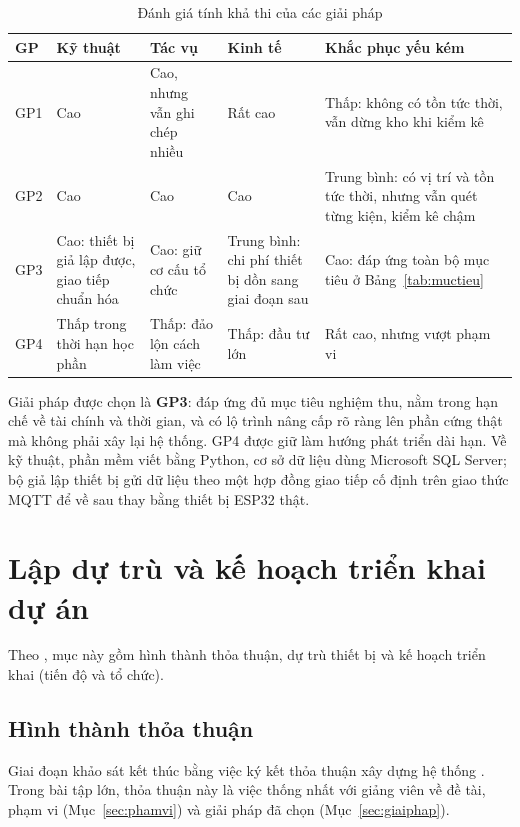 \begin{table}[H]
\centering
\caption{Đánh giá tính khả thi của các giải pháp}
\label{tab:khathi}
\small
\begin{tabularx}{\textwidth}{l L{3cm} L{3cm} L{2.6cm} Y}
\toprule
\textbf{GP} & \textbf{Kỹ thuật} & \textbf{Tác vụ} & \textbf{Kinh tế} & \textbf{Khắc phục yếu kém} \\
\midrule
GP1 & Cao & Cao, nhưng vẫn ghi chép nhiều & Rất cao & Thấp: không có tồn tức thời, vẫn dừng kho khi kiểm kê \\
GP2 & Cao & Cao & Cao & Trung bình: có vị trí và tồn tức thời, nhưng vẫn quét từng kiện, kiểm kê chậm \\
GP3 & Cao: thiết bị giả lập được, giao tiếp chuẩn hóa & Cao: giữ cơ cấu tổ chức & Trung bình: chi phí thiết bị dồn sang giai đoạn sau & Cao: đáp ứng toàn bộ mục tiêu ở Bảng~\ref{tab:muctieu} \\
GP4 & Thấp trong thời hạn học phần & Thấp: đảo lộn cách làm việc & Thấp: đầu tư lớn & Rất cao, nhưng vượt phạm vi \\
\bottomrule
\end{tabularx}
\end{table}

Giải pháp được chọn là \textbf{GP3}: đáp ứng đủ mục tiêu nghiệm thu, nằm trong hạn chế về tài chính và thời gian, và có lộ trình nâng cấp rõ ràng lên phần cứng thật mà không phải xây lại hệ thống. GP4 được giữ làm hướng phát triển dài hạn. Về kỹ thuật, phần mềm viết bằng Python, cơ sở dữ liệu dùng Microsoft SQL Server; bộ giả lập thiết bị gửi dữ liệu theo một hợp đồng giao tiếp cố định trên giao thức MQTT \cite{mqtt5} để về sau thay bằng thiết bị ESP32 thật.

\section{Lập dự trù và kế hoạch triển khai dự án}
\label{sec:kehoach}

Theo \cite[Ch.~4]{tung_qlhttt}, mục này gồm hình thành thỏa thuận, dự trù thiết bị và kế hoạch triển khai (tiến độ và tổ chức).

\subsection{Hình thành thỏa thuận}
Giai đoạn khảo sát kết thúc bằng việc ký kết thỏa thuận xây dựng hệ thống \cite[Ch.~4]{tung_qlhttt}. Trong bài tập lớn, thỏa thuận này là việc thống nhất với giảng viên về đề tài, phạm vi (Mục~\ref{sec:phamvi}) và giải pháp đã chọn (Mục~\ref{sec:giaiphap}).

